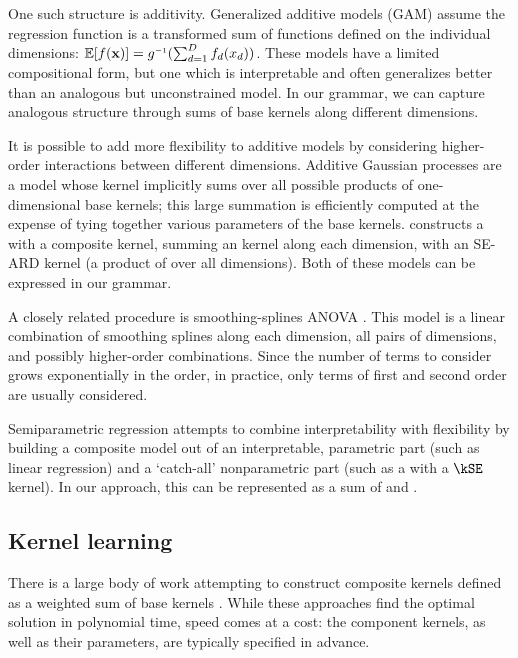 One such structure is additivity.
Generalized additive models (GAM) assume the regression function is a transformed sum of functions defined on the individual dimensions: $\expect[f(\vx)] = g\inv(\sum_{d=1}^D f_d(x_d))$.
These models have a limited compositional form, but one which is interpretable and often generalizes better than an analogous but unconstrained model.
In our grammar, we can capture analogous structure through sums of base kernels along different dimensions.

It is possible to add more flexibility to additive models by considering higher-order interactions between different dimensions. 
Additive Gaussian processes \citep{Duvenaud2011-wb} are a \gp{} model whose kernel implicitly sums over all possible products of one-dimensional base kernels; this large summation is efficiently computed at the expense of tying together various parameters of the base kernels.  
\citet{Plate1999-xh} constructs a \gp{} with a composite kernel, summing an \kSE{} kernel along each dimension, with an SE-ARD kernel (\ie a product of \kSE{} over all dimensions).
Both of these models can be expressed in our grammar.

A closely related procedure is smoothing-splines ANOVA \citep{Wahba1990-ml, Gu2002-at, Wahba2004-fk}.
This model is a linear combination of smoothing splines along each dimension, all pairs of dimensions, and possibly higher-order combinations.
Since the number of terms to consider grows exponentially in the order, in practice, only terms of first and second order are usually considered.

Semiparametric regression \citep[e.g.][]{Ruppert2003-uq} attempts to combine interpretability with flexibility by building  a composite model out of an interpretable, parametric part (such as linear regression) and a `catch-all' nonparametric part (such as a \gp{} with a $\kSE$ kernel).
In our approach, this can be represented as a sum of \kSE{} and \kLin{}.

\subsection{Kernel learning}
There is a large body of work attempting to construct composite kernels defined as a weighted sum of base kernels \citep[e.g.][]{Christoudias2009-an, Bach2009-hr}.
While these approaches find the optimal solution in polynomial time, speed comes at a cost: the component kernels, as well as their parameters, are typically specified in advance.

